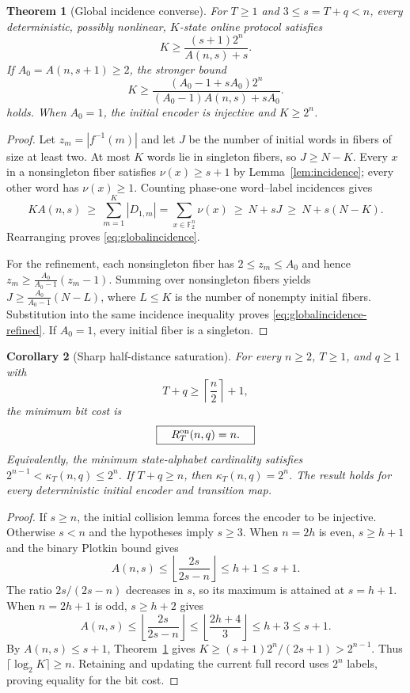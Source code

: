 \documentclass[11pt,a4paper]{article}
\newtheorem{theorem}{Theorem}[section]
\newtheorem{corollary}[theorem]{Corollary}
\newcommand{\F}{\mathbb F_2}
\begin{document}
\begin{theorem}[Global incidence converse]\label{thm:globalincidence}
For $T\ge1$ and $3\le s=T+q<n$, every deterministic, possibly nonlinear, $K$-state online protocol satisfies
\begin{equation}\label{eq:globalincidence}
 \boxed{\quad K\ge\frac{(s+1)2^n}{A(n,s)+s}.\quad}
\end{equation}
If $A_0=A(n,s+1)\ge2$, the stronger bound
\begin{equation}\label{eq:globalincidence-refined}
 \boxed{\quad K\ge
 \frac{(A_0-1+sA_0)2^n}{(A_0-1)A(n,s)+sA_0}.\quad}
\end{equation}
holds. When $A_0=1$, the initial encoder is injective and $K\ge2^n$.
\end{theorem}
\begin{proof}
Let $z_m=|f^{-1}(m)|$ and let $J$ be the number of initial words in fibers of size at least two. At most $K$ words lie in singleton fibers, so $J\ge N-K$. Every $x$ in a nonsingleton fiber satisfies $\nu(x)\ge s+1$ by Lemma~\ref{lem:incidence}; every other word has $\nu(x)\ge1$. Counting phase-one word--label incidences gives
\[
 K A(n,s)\ \ge\ \sum_{m=1}^K |D_{1,m}|
 =\sum_{x\in\F^n}\nu(x)\ \ge\ N+sJ\ \ge\ N+s(N-K).
\]
Rearranging proves \eqref{eq:globalincidence}.

For the refinement, each nonsingleton fiber has $2\le z_m\le A_0$ and hence
$z_m\ge\frac{A_0}{A_0-1}(z_m-1)$. Summing over nonsingleton fibers yields
$J\ge\frac{A_0}{A_0-1}(N-L)$, where $L\le K$ is the number of nonempty initial fibers. Substitution into the same incidence inequality proves \eqref{eq:globalincidence-refined}. If $A_0=1$, every initial fiber is a singleton.
\end{proof}

\begin{corollary}[Sharp half-distance saturation]\label{cor:halfdistance}
For every $n\ge2$, $T\ge1$, and $q\ge1$ with
\begin{equation}\label{eq:halfdistance}
 T+q\ge \left\lceil\frac n2\right\rceil+1,
\end{equation}
the minimum bit cost is
\[
 \boxed{\quad R_T^{\rm on}(n,q)=n.\quad}
\]
Equivalently, the minimum state-alphabet cardinality satisfies
\(2^{n-1}<\kappa_T(n,q)\le 2^n\). If \(T+q\ge n\), then \(\kappa_T(n,q)=2^n\).
The result holds for every deterministic initial encoder and transition map.
\end{corollary}
\begin{proof}
If $s\ge n$, the initial collision lemma forces the encoder to be injective. Otherwise $s<n$ and the hypotheses imply $s\ge3$. When $n=2h$ is even, $s\ge h+1$ and the binary Plotkin bound gives
\[
 A(n,s)\le\left\lfloor\frac{2s}{2s-n}\right\rfloor\le h+1\le s+1.
\]
The ratio $2s/(2s-n)$ decreases in $s$, so its maximum is attained at $s=h+1$. When $n=2h+1$ is odd, $s\ge h+2$ gives
\[
 A(n,s)\le\left\lfloor\frac{2s}{2s-n}\right\rfloor
 \le\left\lfloor\frac{2h+4}{3}\right\rfloor\le h+3\le s+1.
\]
By $A(n,s)\le s+1$, Theorem~\ref{thm:globalincidence} gives $K\ge (s+1)2^n/(2s+1)>2^{n-1}$. Thus $\lceil\log_2 K\rceil\ge n$. Retaining and updating the current full record uses $2^n$ labels, proving equality for the bit cost.
\end{proof}
\end{document}
